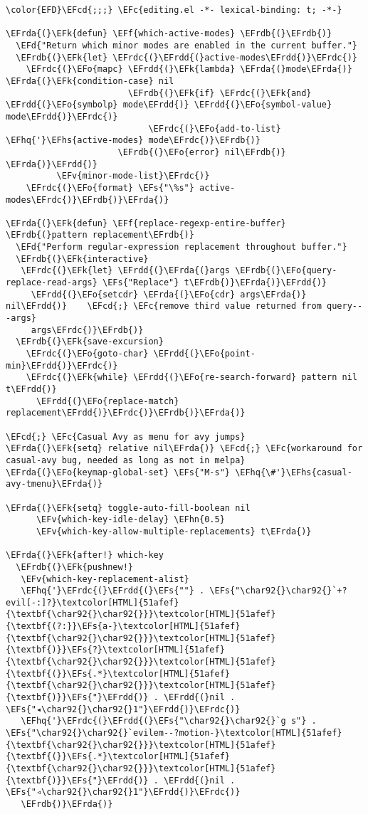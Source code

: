 \documentclass[a4wide,10pt]{article}
\newcommand{\EFc}[1]{\textcolor{EFc}{#1}} %
\newcommand{\EFcd}[1]{\textcolor{EFcd}{#1}} %
\newcommand{\EFs}[1]{\textcolor{EFs}{#1}} %
\newcommand{\EFd}[1]{\textcolor{EFd}{#1}} %
\newcommand{\EFk}[1]{\textcolor{EFk}{#1}} %
\newcommand{\EFf}[1]{\textcolor{EFf}{#1}} %
\newcommand{\EFv}[1]{\textcolor{EFv}{#1}} %
\newcommand{\EFo}[1]{\textcolor{EFo}{#1}} %
\newcommand{\EFhn}[1]{\textcolor{EFhn}{\textbf{#1}}} %
\newcommand{\EFhq}[1]{\textcolor{EFhq}{#1}} %
\newcommand{\EFhs}[1]{\textcolor{EFhs}{#1}} %
\newcommand{\EFrda}[1]{\textcolor{EFrda}{#1}} %
\newcommand{\EFrdb}[1]{\textcolor{EFrdb}{#1}} %
\newcommand{\EFrdc}[1]{\textcolor{EFrdc}{#1}} %
\newcommand{\EFrdd}[1]{\textcolor{EFrdd}{#1}} %
\begin{document}
\begin{Code}
\begin{Verbatim}
\color{EFD}\EFcd{;;;} \EFc{editing.el -*- lexical-binding: t; -*-}

\EFrda{(}\EFk{defun} \EFf{which-active-modes} \EFrdb{(}\EFrdb{)}
  \EFd{"Return which minor modes are enabled in the current buffer."}
  \EFrdb{(}\EFk{let} \EFrdc{(}\EFrdd{(}active-modes\EFrdd{)}\EFrdc{)}
    \EFrdc{(}\EFo{mapc} \EFrdd{(}\EFk{lambda} \EFrda{(}mode\EFrda{)} \EFrda{(}\EFk{condition-case} nil
                        \EFrdb{(}\EFk{if} \EFrdc{(}\EFk{and} \EFrdd{(}\EFo{symbolp} mode\EFrdd{)} \EFrdd{(}\EFo{symbol-value} mode\EFrdd{)}\EFrdc{)}
                            \EFrdc{(}\EFo{add-to-list} \EFhq{'}\EFhs{active-modes} mode\EFrdc{)}\EFrdb{)}
                      \EFrdb{(}\EFo{error} nil\EFrdb{)} \EFrda{)}\EFrdd{)}
          \EFv{minor-mode-list}\EFrdc{)}
    \EFrdc{(}\EFo{format} \EFs{"\%s"} active-modes\EFrdc{)}\EFrdb{)}\EFrda{)}

\EFrda{(}\EFk{defun} \EFf{replace-regexp-entire-buffer} \EFrdb{(}pattern replacement\EFrdb{)}
  \EFd{"Perform regular-expression replacement throughout buffer."}
  \EFrdb{(}\EFk{interactive}
   \EFrdc{(}\EFk{let} \EFrdd{(}\EFrda{(}args \EFrdb{(}\EFo{query-replace-read-args} \EFs{"Replace"} t\EFrdb{)}\EFrda{)}\EFrdd{)}
     \EFrdd{(}\EFo{setcdr} \EFrda{(}\EFo{cdr} args\EFrda{)} nil\EFrdd{)}    \EFcd{;} \EFc{remove third value returned from query---args}
     args\EFrdc{)}\EFrdb{)}
  \EFrdb{(}\EFk{save-excursion}
    \EFrdc{(}\EFo{goto-char} \EFrdd{(}\EFo{point-min}\EFrdd{)}\EFrdc{)}
    \EFrdc{(}\EFk{while} \EFrdd{(}\EFo{re-search-forward} pattern nil t\EFrdd{)}
      \EFrdd{(}\EFo{replace-match} replacement\EFrdd{)}\EFrdc{)}\EFrdb{)}\EFrda{)}

\EFcd{;} \EFc{Casual Avy as menu for avy jumps}
\EFrda{(}\EFk{setq} relative nil\EFrda{)} \EFcd{;} \EFc{workaround for casual-avy bug, needed as long as not in melpa}
\EFrda{(}\EFo{keymap-global-set} \EFs{"M-s"} \EFhq{\#'}\EFhs{casual-avy-tmenu}\EFrda{)}

\EFrda{(}\EFk{setq} toggle-auto-fill-boolean nil
      \EFv{which-key-idle-delay} \EFhn{0.5}
      \EFv{which-key-allow-multiple-replacements} t\EFrda{)}

\EFrda{(}\EFk{after!} which-key
  \EFrdb{(}\EFk{pushnew!}
   \EFv{which-key-replacement-alist}
   \EFhq{'}\EFrdc{(}\EFrdd{(}\EFs{""} . \EFs{"\char92{}\char92{}`+?evil[-:]?}\textcolor[HTML]{51afef}{\textbf{\char92{}\char92{}}}\textcolor[HTML]{51afef}{\textbf{(?:}}\EFs{a-}\textcolor[HTML]{51afef}{\textbf{\char92{}\char92{}}}\textcolor[HTML]{51afef}{\textbf{)}}\EFs{?}\textcolor[HTML]{51afef}{\textbf{\char92{}\char92{}}}\textcolor[HTML]{51afef}{\textbf{(}}\EFs{.*}\textcolor[HTML]{51afef}{\textbf{\char92{}\char92{}}}\textcolor[HTML]{51afef}{\textbf{)}}\EFs{"}\EFrdd{)} . \EFrdd{(}nil . \EFs{"◂\char92{}\char92{}1"}\EFrdd{)}\EFrdc{)}
   \EFhq{'}\EFrdc{(}\EFrdd{(}\EFs{"\char92{}\char92{}`g s"} . \EFs{"\char92{}\char92{}`evilem--?motion-}\textcolor[HTML]{51afef}{\textbf{\char92{}\char92{}}}\textcolor[HTML]{51afef}{\textbf{(}}\EFs{.*}\textcolor[HTML]{51afef}{\textbf{\char92{}\char92{}}}\textcolor[HTML]{51afef}{\textbf{)}}\EFs{"}\EFrdd{)} . \EFrdd{(}nil . \EFs{"◃\char92{}\char92{}1"}\EFrdd{)}\EFrdc{)}
   \EFrdb{)}\EFrda{)}


\end{Verbatim}
\end{Code}
\end{document}
